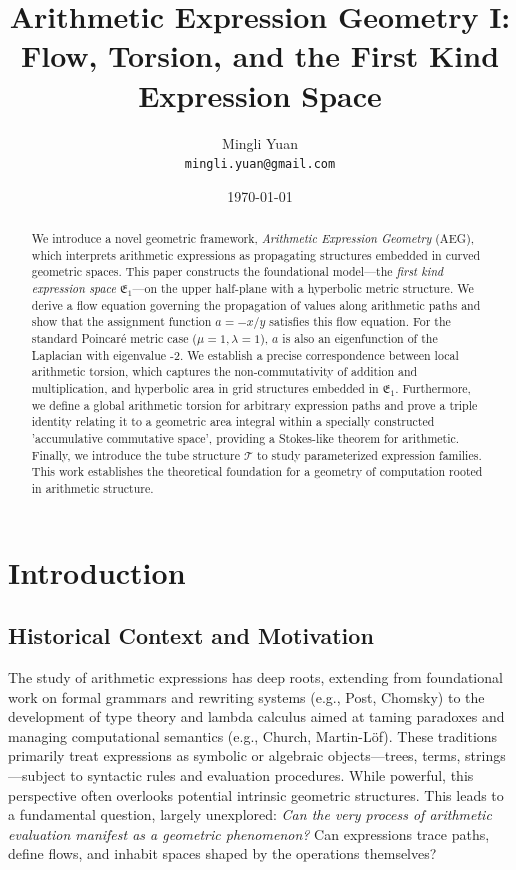 \documentclass[12pt]{article}
\title{Arithmetic Expression Geometry I: Flow, Torsion, and the First Kind Expression Space}
\author{Mingli Yuan \\
        \texttt{mingli.yuan@gmail.com}}
\date{\today}
\begin{document}
\maketitle

\begin{abstract}
We introduce a novel geometric framework, \emph{Arithmetic Expression Geometry} (AEG), which interprets arithmetic expressions as propagating structures embedded in curved geometric spaces. This paper constructs the foundational model---the \emph{first kind expression space} \( \mathfrak{E}_1 \)---on the upper half-plane with a hyperbolic metric structure. We derive a flow equation governing the propagation of values along arithmetic paths and show that the assignment function \( a = -x/y \) satisfies this flow equation. For the standard Poincaré metric case (\(\mu=1, \lambda=1\)), \(a\) is also an eigenfunction of the Laplacian with eigenvalue -2. We establish a precise correspondence between local arithmetic torsion, which captures the non-commutativity of addition and multiplication, and hyperbolic area in grid structures embedded in \( \mathfrak{E}_1 \). Furthermore, we define a global arithmetic torsion for arbitrary expression paths and prove a triple identity relating it to a geometric area integral within a specially constructed 'accumulative commutative space', providing a Stokes-like theorem for arithmetic. Finally, we introduce the tube structure \( \mathcal{T} \) to study parameterized expression families. This work establishes the theoretical foundation for a geometry of computation rooted in arithmetic structure.
\end{abstract}

\tableofcontents
\newpage

\section{Introduction}

\subsection{Historical Context and Motivation}
The study of arithmetic expressions has deep roots, extending from foundational work on formal grammars and rewriting systems (e.g., Post\cite{Post1943FormalRO}, Chomsky\cite{Chomsky1956ThreeMF}) to the development of type theory and lambda calculus aimed at taming paradoxes and managing computational semantics (e.g., Church\cite{Church1940AFO}, Martin-L\"{o}f\cite{MartinLf1975AnIT}). These traditions primarily treat expressions as symbolic or algebraic objects—trees, terms, strings—subject to syntactic rules and evaluation procedures. While powerful, this perspective often overlooks potential intrinsic geometric structures. This leads to a fundamental question, largely unexplored: \textit{Can the very process of arithmetic evaluation manifest as a geometric phenomenon?} Can expressions trace paths, define flows, and inhabit spaces shaped by the operations themselves?
\end{document}
